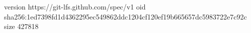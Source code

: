 version https://git-lfs.github.com/spec/v1
oid sha256:1ed7398fd1d4362295ec549862ddc1204cf120ef19b665657dc5983722e7c92c
size 427818
